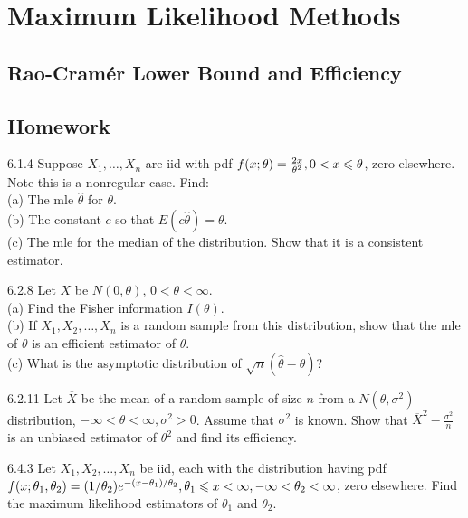 \chapter{Maximum Likelihood Methods}

\section{Rao-Cram\'er Lower Bound and Efficiency}



\section{Homework}

\begin{exercise}{6.1.4}{}
    Suppose $X_1,\dots,X_n$ are iid with pdf $f(x;\theta)=\frac{2x}{\theta^2},0<x\leqslant \theta$, zero elsewhere. Note this is a nonregular case. Find:\\
    (a) The mle $\hat{\theta}$ for $\theta$.\\
    (b) The constant $c$ so that $E(c\hat{\theta})=\theta$.\\
    (c) The mle for the median of the distribution. Show that it is a consistent estimator.
\end{exercise}

\begin{exercise}{6.2.8}{}
    Let $X$ be $N(0,\theta)$, $0<\theta<\infty$.\\
    (a) Find the Fisher information $I(\theta)$.\\
    (b) If $X_1,X_2,\dots,X_n$ is a random sample from this distribution,
    show that the mle of $\theta$ is an efficient estimator of $\theta$.\\
    (c) What is the asymptotic distribution of $\sqrt{n}(\hat{\theta}-\theta)$?
\end{exercise}

\begin{exercise}{6.2.11}{}
    Let $\overline{X}$ be the mean of a random sample of size $n$ from a $N(\theta,\sigma^2)$ 
    distribution, $-\infty<\theta<\infty,\sigma^2>0$. Assume that $\sigma^2$ is known. Show that $\overline{X}^2-\frac{\sigma^2}{n}$ 
    is an unbiased estimator of $\theta^2$ and find its efficiency.
\end{exercise}


\begin{exercise}{6.4.3}{}
    Let $X_1,X_2,\dots,X_n$ be iid, each with the distribution having pdf $f(x;\theta_1,\theta_2)=(1/\theta_2)e^{-(x-\theta_1)/\theta_2}, \theta_1\leqslant x<\infty, -\infty<\theta_2<\infty$,
    zero elsewhere. Find the maximum likelihood estimators of $\theta_1$ and $\theta_2$. 
\end{exercise}



